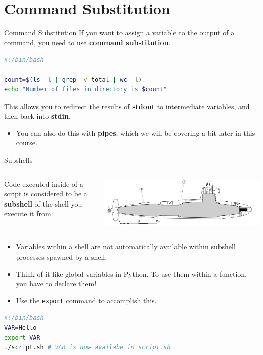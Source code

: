 \documentclass[11pt]{beamer}
\begin{document}
\section[Substitution]{Command Substitution}
\begin{frame}[fragile=singleslide]{Command Substitution}
If you want to assign a variable to the output of a command, you need to use \textbf{command substitution}.

\begin{lstlisting}[style=terminal, language=bash]
#!/bin/bash

count=$(ls -l | grep -v total | wc -l)
echo "Number of files in directory is $count"
\end{lstlisting}
This allows you to redirect the results of \textbf{stdout} to intermediate variables, and then back into \textbf{stdin}. 
\begin{itemize}
\item You can also do this with \textbf{pipes}, which we will be covering a bit later in this course.
\end{itemize}
\end{frame}

\begin{frame}[fragile=singleslide]{Subshells}
\begin{columns}
\begin{column}{0.6\textwidth}
Code executed inside of a script is considered to be a \textbf{subshell} of the shell you execute it from.  
\end{column}
\begin{column}{0.38\textwidth}
\vspace{-0.5em}
\center
\includegraphics[scale=0.05]{subshell.png}
\end{column}
\end{columns}
\begin{itemize}
\item Variables within a shell are not automatically available within subshell processes spawned by a shell.  
\item Think of it like global variables in Python.  To use them within a function, you have to declare them!
\item Use the \texttt{export} command to accomplish this.
\end{itemize}
\begin{lstlisting}[style=terminal, language=bash]
#!/bin/bash
VAR=Hello
export VAR
./script.sh # VAR is now availabe in script.sh
\end{lstlisting}
\end{frame}
\end{document}
